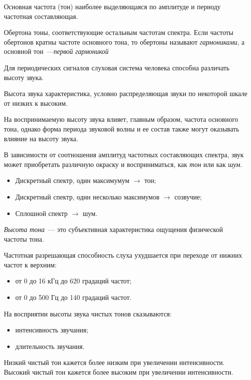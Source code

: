 \documentclass{beamer}
\begin{document}
\begin{frame}
  \begin{block}{Основная частота (тон)}
    наиболее выделяющаяся по амплитуде и периоду частотная составляющая.   
  \end{block}

  \begin{block}{Обертона}
    тоны, соответствующие остальным частотам спектра. Если частоты обертонов кратны   частоте основного тона, то обертоны называют {\itshape гармониками}, а основной тон~---{\itshape первой гармоникой}
  \end{block}

Для периодических сигналов слуховая система человека способна различать высоту звука.

  \begin{block}{Высота звука}
    характеристика, условно распределяющая звуки по некоторой шкале от низких к высоким.
  \end{block}

На воспринимаемую высоту звука влияет, главным образом, частота основного тона, однако форма периода звуковой волны и ее состав также могут оказывать влияние на высоту звука.

\end{frame}

\begin{frame}
В зависимости от соотношения амплитуд частотных составляющих спектра, звук может приобретать различную окраску и восприниматься, как {\itshape тон} или как
{\itshape шум}. 

\begin{itemize}
\item Дискретный спектр, один максимумум $\rightarrow$ тон;
\item Дискретный спектр, один несколько максимумов $\rightarrow$ созвучие;
\item Сплошной спектр $\rightarrow$ шум.
\end{itemize}

{\itshape Высота тона}~--- это субъективная характеристика ощущения физической частоты тона.

Частотная разрешающая способность слуха ухудшается при переходе от нижних частот к верхним: 
\begin{itemize}
\item от 0 до 16 кГц до 620 градаций частот;
\item от 0 до 500 Гц до 140 градаций частот.
\end{itemize}

На восприятии высоты звука чистых тонов сказываются:
\begin{itemize}
\item интенсивность звучания;
\item длительность звучания. 
\end{itemize}
Низкий чистый тон кажется более низким при увеличении интенсивности. 
Высокий чистый тон кажется более высоким при увеличении интенсивности.
\end{frame}
\end{document}
